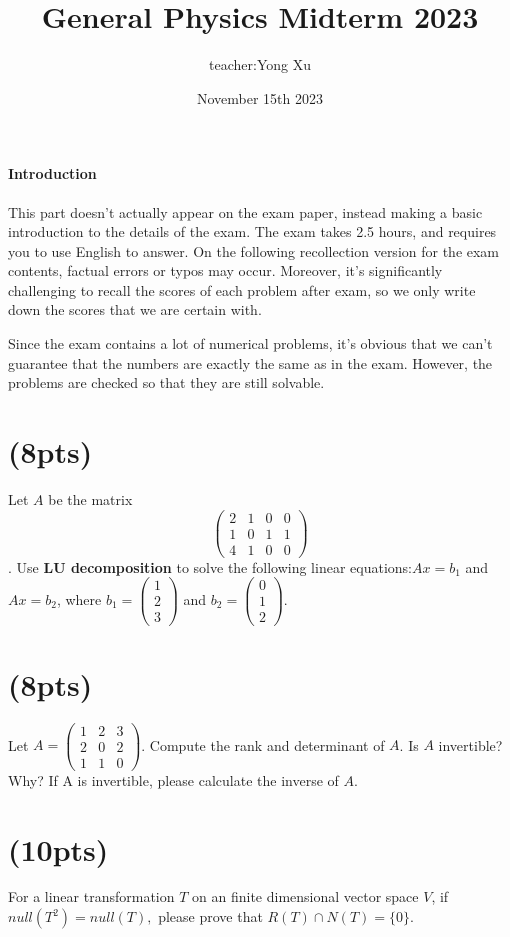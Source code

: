 \documentclass{article}
\title{General Physics Midterm 2023}
\author{teacher:Yong Xu}
\date{November 15th 2023}
\begin{document}
\maketitle
\paragraph{Introduction}
This part doesn't actually appear on the exam paper, instead making a basic introduction to the details of the exam. The exam takes 2.5 hours, and requires you to use English to answer. On the following recollection version for the exam contents, factual errors or typos may occur. Moreover, it's significantly challenging to recall the scores of each problem after exam, so we only write down the scores that we are certain with.

Since the exam contains a lot of numerical problems, it's obvious that we can't guarantee that the numbers are exactly the same as in the exam. However, the problems are checked so that they are still solvable.

\section{(8pts)}
Let $A$ be the matrix $$\begin{pmatrix} 2 & 1 & 0 & 0\\ 1 & 0 & 1 & 1 \\ 4 & 1 & 0 & 0 \end{pmatrix}$$ . Use \textbf{LU decomposition} to solve the following linear equations:$Ax=b_1$ and $Ax=b_2$, where $b_1=\begin{pmatrix}1\\2\\3\end{pmatrix}$ and $b_2=\begin{pmatrix}0\\1\\2\end{pmatrix}$.

\section{(8pts)}
Let $A=\begin{pmatrix}
    1&2&3\\2&0&2\\1&1&0
\end{pmatrix}$. Compute the rank and determinant of $A$. Is $A$ invertible? Why? If A is invertible, please calculate the inverse of $A$.
\section{(10pts)}
For a linear transformation $T$ on an finite dimensional vector space $V$, if $null(T^2)=null(T),$ please prove that $R(T)\cap N(T)=\{0\}.$
\end{document}
